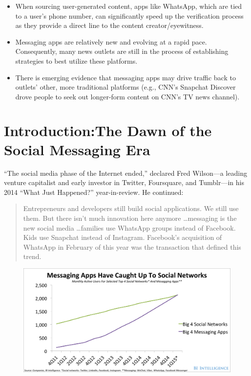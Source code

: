 \documentclass[notoc, symmetric, nobib, nols]{towcenter-guideto-book}
\newcommand{\blankpage}{\newpage\hbox{}\thispagestyle{empty}\newpage}
\begin{document}
\begin{itemize}[itemsep=.5em]
\item When sourcing user-generated content, apps like WhatsApp, which are tied to a user's phone number, can significantly speed up the verification process as they provide a direct line to the content creator/eyewitness.

\item Messaging apps are relatively new and evolving at a rapid pace. Consequently, many news outlets are still in the process of establishing strategies to best utilize these platforms.

\item There is emerging evidence that messaging apps may drive traffic back to outlets' other, more traditional platforms (e.g., CNN's Snapchat Discover drove people to seek out longer-form content on CNN's TV news channel).
\end{itemize}

\blankpage
\chapter[Introduction: The Dawn of the Social Messaging Era]{Introduction:\protect\newline The Dawn of the \protect\newline Social Messaging Era}
\blankpage


\noindent ``The social media phase of the Internet ended,'' declared Fred Wilson---a leading venture capitalist and early investor in Twitter, Foursquare, and Tumblr---in his 2014 ``What Just Happened?'' year-in-review. He continued: 

\begin{quote}
Entrepreneurs and developers still build social applications. We still use them. But there isn't much innovation here anymore \ldots messaging is the new social media \ldots families use WhatsApp groups instead of Facebook. Kids use Snapchat instead of Instagram. Facebook's acquisition of WhatsApp in February of this year was the transaction that defined this trend.\autocite{AVCwhatjusthappened}
\end{quote}

\begin{figure}
\includegraphics[width=1\textwidth]{graphics/CHATAPPS_Page6_Chart.png}
\end{figure}
\end{document}
